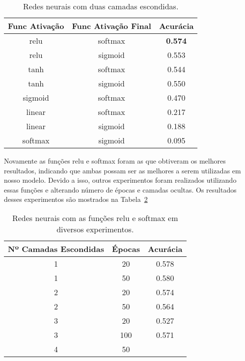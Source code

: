 \documentclass[conference]{IEEEtran}
\begin{document}
\begin{table}[h!]
	\centering	
	\begin{tabular}{ccc} \toprule
		\textbf{Func Ativação} & \textbf{Func Ativação Final} & \textbf{Acurácia} \\ \toprule 	
		relu                   & softmax                      & \textbf{0.574}             \\
		relu                   & sigmoid                      & 0.553             \\
		tanh                   & softmax                      & 0.544             \\
		tanh                   & sigmoid                      & 0.550             \\
		sigmoid                & softmax                      & 0.470             \\
		linear                 & softmax                      & 0.217             \\
		linear                 & sigmoid                      & 0.188             \\
		softmax                & sigmoid                      & 0.095             \\ \bottomrule      
	\end{tabular}
	\caption{Redes neurais com duas camadas escondidas.}
	\label{tab:2hl}
\end{table}

Novamente as funções relu e softmax foram as que obtiveram os melhores resultados, indicando que ambas possam ser as melhores a serem utilizadas em nosso modelo. Devido a isso, outros experimentos foram realizados utilizando essas funções e alterando número de épocas e camadas ocultas. Os resultados desses experimentos são mostrados na Tabela~\ref{tab:misc} 


\begin{table}[h!]
	\centering
	
	\begin{tabular}{ccc} \toprule
	\textbf{Nº Camadas Escondidas} & \textbf{Épocas} & \textbf{Acurácia}    \\ \toprule 	
	1                              & 20              & 0.578                \\
	1                              & 50              & 0.580   				\\
	2                              & 20              & 0.574                \\
	2                              & 50              & 0.564                \\
	3                              & 20              & 0.527                \\
	3                              & 100             & 0.571                \\
	4                              & 50              &                      \\
	\bottomrule      
	\end{tabular}
	\caption{Redes neurais com as funções relu e softmax em diversos experimentos.}
	\label{tab:misc}
\end{table}
\end{document}
